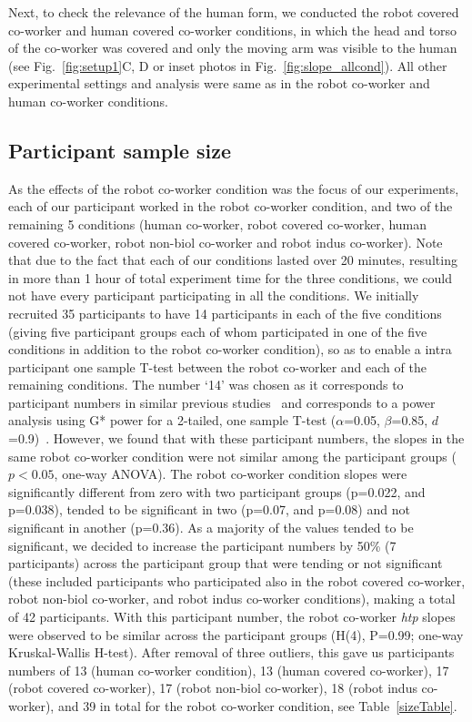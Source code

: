 Next, to check the relevance of the human form, we conducted the robot covered co-worker and human covered co-worker conditions, in which the head and torso of the co-worker was covered and only the moving arm was visible to the human (see Fig.~\ref{fig:setup1}C, D or inset photos in Fig.~\ref{fig:slope_allcond}). All other experimental settings and analysis were same as in the robot co-worker and human co-worker conditions.


\subsection{Participant sample size}

As the effects of the robot co-worker condition was the focus of our experiments, each of our participant worked in the robot co-worker condition, and two of the remaining 5 conditions (human co-worker, robot covered co-worker, human covered co-worker, robot non-biol co-worker and robot indus co-worker). Note that due to the fact that each of our conditions lasted over 20 minutes, resulting in more than 1 hour of total experiment time for the three conditions, we could not have every participant participating in all the conditions. We initially recruited 35 participants to have 14 participants in each of the five conditions (giving five participant groups each of whom participated in one of the five conditions in addition to the robot co-worker condition), so as to enable a intra participant one sample T-test between the robot co-worker and each of the remaining conditions. The number `14' was chosen as it corresponds to participant numbers in similar previous studies~\cite{Bisio:PlosOne:2010,Bisio:PlosOne:2014} and corresponds to a power analysis using G* power for a 2-tailed, one sample T-test ($\alpha$=0.05, $\beta$=0.85, $d$=0.9)~\cite{Erdfelder:JBRMIC:1996, Verma:power_analysis:2017}. However, we found that with these participant numbers, the slopes in the same robot co-worker condition were not similar among the participant groups ($p<0.05$, one-way ANOVA). The robot co-worker condition slopes were significantly different from zero with two participant groups (p=0.022, and p=0.038), tended to be significant in two (p=0.07, and p=0.08) and not significant in another (p=0.36). As a majority of the values tended to be significant, we decided to increase the participant numbers by 50\% (7 participants) across the participant group that were tending or not significant (these included participants who participated also in the robot covered co-worker, robot non-biol co-worker, and robot indus co-worker conditions), making a total of 42 participants. With this participant number, the robot co-worker {\it htp} slopes were observed to be similar across the participant groups (H(4), P=0.99; one-way Kruskal-Wallis H-test). After removal of three outliers, this gave us participants numbers of 13 (human co-worker condition), 13 (human covered co-worker), 17 (robot covered co-worker), 17 (robot non-biol co-worker), 18 (robot indus co-worker), and 39 in total for the robot co-worker condition, see Table~\ref{sizeTable}.

